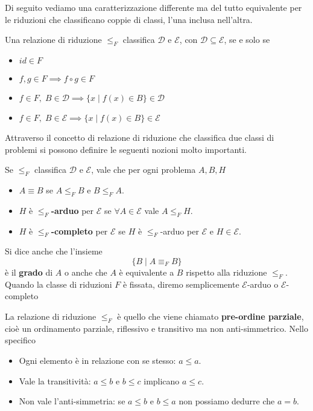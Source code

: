 Di seguito vediamo una caratterizzazione differente ma del tutto
equivalente per le riduzioni che classificano coppie di classi,
l'una inclusa nell'altra.

\begin{lemma} \label{lemma: classificazione}
	Una relazione di riduzione $\leq_F$ classifica $\mathcal{D}$
	e $\mathcal{E}$, con $\mathcal{D} \subseteq \mathcal{E}$, se
	e solo se
	\begin{itemize}
		\item $id \in F$
		\item $f, g \in F \implies f \circ g \in F$
		\item $f \in F, \; B \in \mathcal{D} \implies
			      \{ x \mid f(x) \in B \} \in \mathcal{D}$
		\item $f \in F, \; B \in \mathcal{E} \implies
			      \{ x \mid f(x) \in B \} \in \mathcal{E}$
	\end{itemize}
\end{lemma}

Attraverso il concetto di relazione di riduzione che classifica
due classi di problemi si possono definire le seguenti nozioni
molto importanti.

\begin{definition}
	Se $\leq_F$ classifica $\mathcal{D}$ e $\mathcal{E}$, vale
	che per ogni problema $A, B, H$
	\begin{itemize}
		\item $A \equiv B$ se $A \leq_F B$ e $B \leq_F A$.
		\item $H$ è \textbf{$\leq_F$-arduo} per $\mathcal{E}$ se
		      $\forall A \in \mathcal{E}$ vale $A \leq_F H$.
		\item $H$ è \textbf{$\leq_F$-completo} per $\mathcal{E}$
		      se $H$ è $\leq_F$-arduo per $\mathcal{E}$ e
		      $H \in \mathcal{E}$.
	\end{itemize}
\end{definition}

Si dice anche che l'insieme
\[ \{ B \mid A \equiv_F B \} \]
è il \textbf{grado} di $A$ o anche che $A$ è equivalente a $B$
rispetto alla riduzione $\leq_F$. Quando la classe di riduzioni
$F$ è fissata, diremo semplicemente $\mathcal{E}$-arduo o
$\mathcal{E}$-completo

La relazione di riduzione $\leq_F$ è quello che viene chiamato
\textbf{pre-ordine parziale}, cioè un ordinamento parziale,
riflessivo e transitivo ma non anti-simmetrico. Nello specifico
\begin{itemize}
	\item Ogni elemento è in relazione con se stesso: $a \leq a$.
	\item Vale la transitività: $a \leq b$ e $b \leq c$ implicano
	      $a \leq c$.
	\item Non vale l'anti-simmetria: se $a \leq b$ e $b \leq a$
	      non possiamo dedurre che $a = b$.
\end{itemize}

